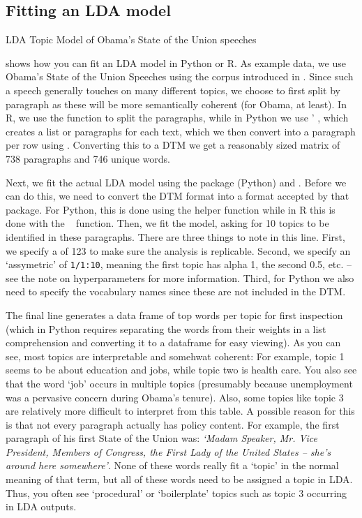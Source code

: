 \subsection{Fitting an LDA model}


\begin{ccsexample}
\caption{LDA Topic Model of Obama's State of the Union speeches}\label{ex:lda}
\end{ccsexample}

 shows how you can fit an LDA model in Python or R.
As example data, we use Obama's State of the Union Speeches using the corpus introduced in .
Since such a speech generally touches on many different topics, we choose to first split by paragraph
as these will be more semantically coherent (for Obama, at least).
In R, we use the  function to split the paragraphs,
while in Python we use \pandas' , which creates a list or paragraphs for each text,
which we then convert into a paragraph per row using .
Converting this to a DTM we get a reasonably sized matrix of 738 paragraphs and 746 unique words.

Next, we fit the actual LDA model using the package  (Python) and .
Before we can do this, we need to convert the DTM format into a format accepted by that package.
For Python, this is done using the  helper function while in R this is done with the \quanteda\  function.
Then, we fit the model, asking for 10 topics to be identified in these paragraphs.
There are three things to note in this line.
First, we specify a  of 123 to make sure the analysis is replicable.
Second, we specify an `assymetric' of \verb|1/1:10|, meaning the first topic has alpha 1, the second 0.5, etc.
-- see the note on hyperparameters for more information. 
Third, for Python we also need to specify the vocabulary names since these are not included in the DTM.

The final line generates a data frame of top words per topic for first inspection
(which in Python requires separating the words from their weights in a list comprehension and converting it to a dataframe for easy viewing).
As you can see, most topics are interpretable and somehwat coherent: For example, topic 1 seems to be about education and jobs,
while topic two is health care. You also see that the word `job' occurs in multiple topics (presumably because unemployment was a pervasive concern during Obama's tenure).
Also, some topics like topic 3 are relatively more difficult to interpret from this table.
A possible reason for this is that not every paragraph actually has policy content.
For example, the first paragraph of his first State of the Union was:
\emph{`Madam Speaker, Mr. Vice President, Members of Congress, the First Lady of the United States -- she's around here somewhere'}.
None of these words really fit a `topic' in the normal meaning of that term,
but all of these words need to be assigned a topic in LDA.
Thus, you often see `procedural' or `boilerplate' topics such as topic 3 occurring in LDA outputs. 


